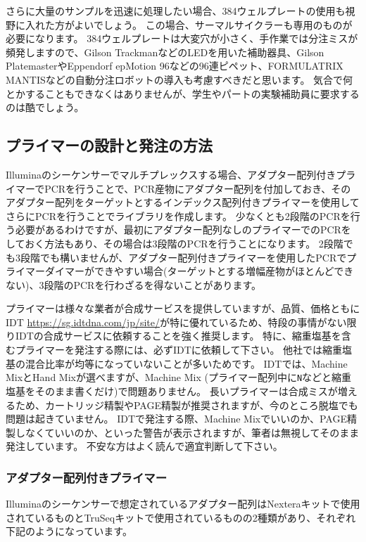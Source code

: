 \documentclass[titlepage,10pt,a4paper,uplatex]{jsbook}
\begin{document}
さらに大量のサンプルを迅速に処理したい場合、384ウェルプレートの使用も視野に入れた方がよいでしょう。
この場合、サーマルサイクラーも専用のものが必要になります。
384ウェルプレートは大変穴が小さく、手作業では分注ミスが頻発しますので、Gilson TrackmanなどのLEDを用いた補助器具、Gilson PlatemasterやEppendorf epMotion 96などの96連ピペット、FORMULATRIX MANTISなどの自動分注ロボットの導入も考慮すべきだと思います。
気合で何とかすることもできなくはありませんが、学生やパートの実験補助員に要求するのは酷でしょう。

\subsection{プライマーの設計と発注の方法}

Illuminaのシーケンサーでマルチプレックスする場合、アダプター配列付きプライマーでPCRを行うことで、PCR産物にアダプター配列を付加しておき、そのアダプター配列をターゲットとするインデックス配列付きプライマーを使用してさらにPCRを行うことでライブラリを作成します。
少なくとも2段階のPCRを行う必要があるわけですが、最初にアダプター配列なしのプライマーでのPCRをしておく方法もあり、その場合は3段階のPCRを行うことになります。
2段階でも3段階でも構いませんが、アダプター配列付きプライマーを使用したPCRでプライマーダイマーができやすい場合(ターゲットとする増幅産物がほとんどできない)、3段階のPCRを行わざるを得ないことがあります。

プライマーは様々な業者が合成サービスを提供していますが、品質、価格ともにIDT \url{https://sg.idtdna.com/jp/site/}が特に優れているため、特段の事情がない限りIDTの合成サービスに依頼することを強く推奨します。
特に、縮重塩基を含むプライマーを発注する際には、必ずIDTに依頼して下さい。
他社では縮重塩基の混合比率が均等になっていないことが多いためです。
IDTでは、Machine MixとHand Mixが選べますが、Machine Mix (プライマー配列中に\texttt{N}などと縮重塩基をそのまま書くだけ)で問題ありません。
長いプライマーは合成ミスが増えるため、カートリッジ精製やPAGE精製が推奨されますが、今のところ脱塩でも問題は起きていません。
IDTで発注する際、Machine Mixでいいのか、PAGE精製しなくていいのか、といった警告が表示されますが、筆者は無視してそのまま発注しています。
不安な方はよく読んで適宜判断して下さい。

\subsubsection{アダプター配列付きプライマー}

Illuminaのシーケンサーで想定されているアダプター配列はNexteraキットで使用されているものとTruSeqキットで使用されているものの2種類があり、それぞれ下記のようになっています。
\end{document}
